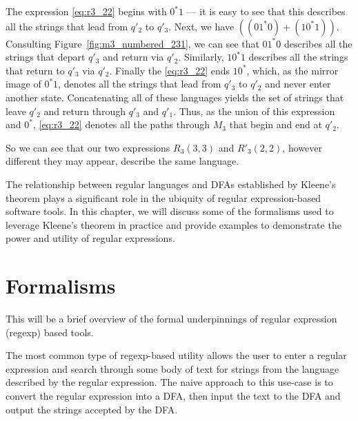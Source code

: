 \documentclass{bcthesis}
\renewcommand{\meo}[1]{}
\begin{document}
		The expression \ref{eq:r3_22} begins with $0^*1$ --- it is easy to see that this describes all the strings that lead from $q'_2$ to $q'_3$.
		Next, we have $((01^*0) + (10^*1))$. 
		Consulting Figure~\ref{fig:m3_numbered_231}, we can see that $01^*0$ describes all the strings that depart $q'_3$ and return via $q'_2$.
		Similarly, $10^*1$ describes all the strings that return to $q'_3$ via $q'_2$.
		Finally the \ref{eq:r3_22} ends $10^*$, which, as the mirror image of $0^*1$, denotes all the strings that lead from $q'_3$ to $q'_2$ and never enter another state.
		Concatenating all of these languages yields the set of strings that leave $q'_2$ and return through $q'_3$ and $q'_1$.
		Thus, as the union of this expression and $0^*$, \ref{eq:r3_22} denotes all the paths through $M_3$ that begin and end at $q'_2$.

		So we can see that our two expressions $R_3(3,3)$ and $R'_3(2, 2)$, however different they may appear, describe the same language.


	\meo{
		Figure out if there are any other parts of the proof that deserve an example to help explain them.
		I will probably include pictures for regular language $\iff$ representable in the initial proof.
		It would be nice to include a power set construction, but it would also end up being pretty long.
	}



\label{sec:motivation}

	The relationship between regular languages and DFAs established by Kleene's theorem plays a significant role in the ubiquity of regular expression-based software tools. 
	In this chapter, we will discuss some of the formalisms used to leverage Kleene's theorem in practice and provide examples to demonstrate the power and utility of regular expressions.

	\section{Formalisms} %
	\label{sec:formalisms}
		This will be a brief overview of the formal underpinnings of regular expression (regexp) based tools.

		The most common type of regexp-based utility allows the user to enter a regular expression and search through some body of text for strings from the language described by the regular expression.
		The naive approach to this use-case is to convert the regular expression into a DFA, then input the text to the DFA and output the strings accepted by the DFA.
		
\end{document}
